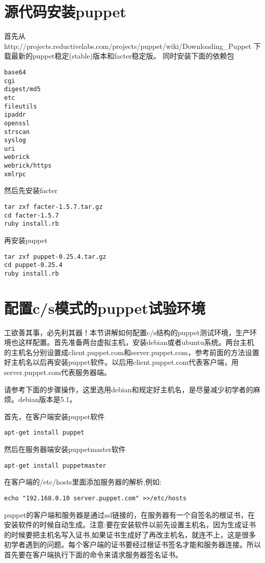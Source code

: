 \section{\msyh 源代码安装puppet}
首先从http://projects.reductivelabs.com/projects/puppet/wiki/Downloading\_Puppet 下载最新的puppet稳定(stable)版本和facter稳定版。
同时安装下面的依赖包
\msyh
\begin{lstlisting}
base64
cgi
digest/md5
etc
fileutils
ipaddr
openssl
strscan
syslog
uri
webrick
webrick/https
xmlrpc
\end{lstlisting}
\song
然后先安装facter
\msyh
\begin{lstlisting}
tar zxf facter-1.5.7.tar.gz
cd facter-1.5.7
ruby install.rb
\end{lstlisting}
\song
再安装puppet
\msyh
\begin{lstlisting}
tar zxf puppet-0.25.4.tar.gz
cd puppet-0.25.4
ruby install.rb
\end{lstlisting}
\song

\section{\msyh 配置c/s模式的puppet试验环境}
工欲善其事，必先利其器！本节讲解如何配置c/s结构的puppet测试环境，生产环境也这样配置。首先准备两台虚拟主机，安装debian或者ubuntu系统。两台主机的主机名分别设置成client.puppet.com和server.puppet.com，参考前面的方法设置好主机名以后再安装puppet软件。以后用client.puppet.com代表客户端，用server.puppet.com代表服务器端。\par
请参考下面的步骤操作，这里选用debian和规定好主机名，是尽量减少初学者的麻烦。debian版本是5.1。\par
首先，在客户端安装puppet软件\par

\msyh
\begin{lstlisting}
apt-get install puppet
\end{lstlisting}
\song

然后在服务器端安装puppetmaster软件

\msyh
\begin{lstlisting}
apt-get install puppetmaster
\end{lstlisting}
\song
在客户端的/etc/hosts里面添加服务器的解析,例如:
\msyh
\begin{lstlisting}
echo "192.168.0.10 server.puppet.com" >>/etc/hosts
\end{lstlisting}
\song

puppet的客户端和服务器是通过ssl链接的，在服务器有一个自签名的根证书，在安装软件的时候自动生成。\msyh 注意:要在安装软件以前先设置主机名，因为生成证书的时候要把主机名写入证书,如果证书生成好了再改主机名，就连不上，这是很多初学者遇到的问题。\song 每个客户端的证书要经过根证书签名才能和服务器连接。所以首先要在客户端执行下面的命令来请求服务器签名证书。

